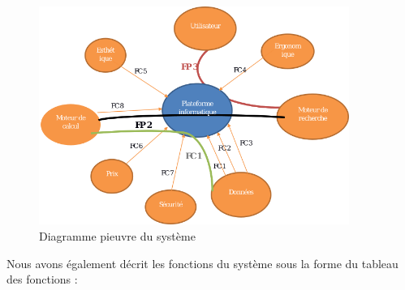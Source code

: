 \documentclass[a4paper]{article}
\begin{document}
\begin{figure}[h]
	\centering
	\includegraphics[width=0.9\textwidth]{./tmp/DiagPieuvre.png}
	\caption{Diagramme pieuvre du système}
\end{figure}
\newpage
{}
Nous avons également décrit les fonctions du système sous la forme du tableau des fonctions :
\end{document}
